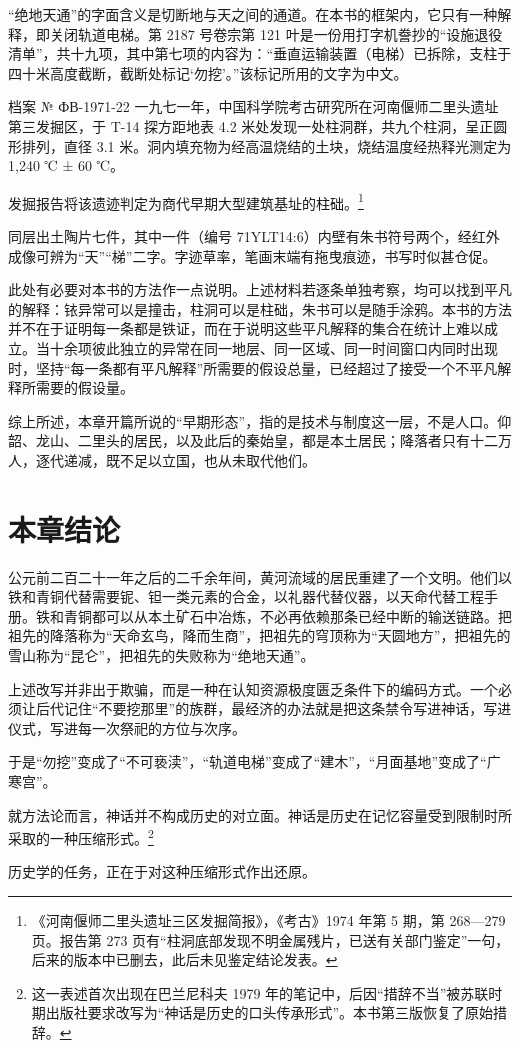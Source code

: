 “绝地天通”的字面含义是切断地与天之间的通道。在本书的框架内，它只有一种解释，即关闭轨道电梯。第 2187 号卷宗第 121 叶是一份用打字机誊抄的“设施退役清单”，共十九项，其中第七项的内容为：“垂直运输装置（电梯）已拆除，支柱于四十米高度截断，截断处标记‘勿挖’。”该标记所用的文字为中文。

\begin{archive}{档案 № ФВ-1971-22}
一九七一年，中国科学院考古研究所在河南偃师二里头遗址第三发掘区，于 T-14 探方距地表 4.2 米处发现一处柱洞群，共九个柱洞，呈正圆形排列，直径 3.1 米。洞内填充物为经高温烧结的土块，烧结温度经热释光测定为 1{,}240 ℃ ± 60 ℃。

发掘报告将该遗迹判定为商代早期大型建筑基址的柱础。\footnote{《河南偃师二里头遗址三区发掘简报》，《考古》1974 年第 5 期，第 268—279 页。报告第 273 页有“柱洞底部发现不明金属残片，已送有关部门鉴定”一句，后来的版本中已删去，此后未见鉴定结论发表。}

同层出土陶片七件，其中一件（编号 71YLT14:6）内壁有朱书符号两个，经红外成像可辨为“天”“梯”二字。字迹草率，笔画末端有拖曳痕迹，书写时似甚仓促。
\end{archive}

此处有必要对本书的方法作一点说明。上述材料若逐条单独考察，均可以找到平凡的解释：铱异常可以是撞击，柱洞可以是柱础，朱书可以是随手涂鸦。本书的方法并不在于证明每一条都是铁证，而在于说明这些平凡解释的集合在统计上难以成立。当十余项彼此独立的异常在同一地层、同一区域、同一时间窗口内同时出现时，坚持“每一条都有平凡解释”所需要的假设总量，已经超过了接受一个不平凡解释所需要的假设量。

综上所述，本章开篇所说的“早期形态”，指的是技术与制度这一层，不是人口。仰韶、龙山、二里头的居民，以及此后的秦始皇，都是本土居民；降落者只有十二万人，逐代递减，既不足以立国，也从未取代他们。

\section{本章结论}

公元前二百二十一年之后的二千余年间，黄河流域的居民重建了一个文明。他们以铁和青铜代替需要铌、钽一类元素的合金，以礼器代替仪器，以天命代替工程手册。铁和青铜都可以从本土矿石中冶炼，不必再依赖那条已经中断的输送链路。把祖先的降落称为“天命玄鸟，降而生商”，把祖先的穹顶称为“天圆地方”，把祖先的雪山称为“昆仑”，把祖先的失败称为“绝地天通”。

上述改写并非出于欺骗，而是一种在认知资源极度匮乏条件下的编码方式。一个必须让后代记住“不要挖那里”的族群，最经济的办法就是把这条禁令写进神话，写进仪式，写进每一次祭祀的方位与次序。

于是“勿挖”变成了“不可亵渎”，“轨道电梯”变成了“建木”，“月面基地”变成了“广寒宫”。

就方法论而言，神话并不构成历史的对立面。神话是历史在记忆容量受到限制时所采取的一种压缩形式。\footnote{这一表述首次出现在巴兰尼科夫 1979 年的笔记中，后因“措辞不当”被苏联时期出版社要求改写为“神话是历史的口头传承形式”。本书第三版恢复了原始措辞。}

历史学的任务，正在于对这种压缩形式作出还原。
